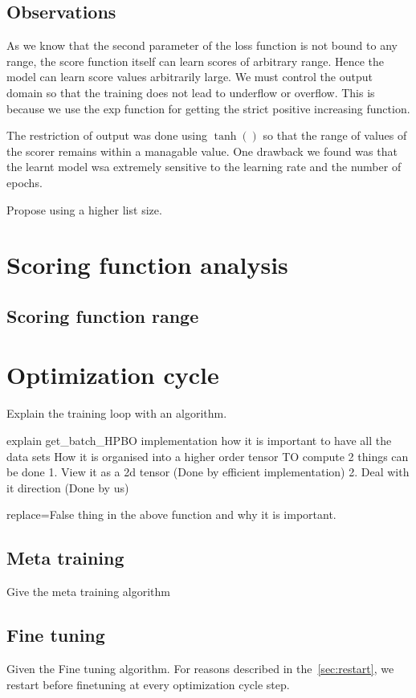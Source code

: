 \documentclass[11pt]{report}
\begin{document}
\subsection{Observations}
As we know that the second parameter of the loss function is not bound to any range, 
the score function itself can learn scores of arbitrary range.
Hence the model can learn score values arbitrarily large.
We must control the output domain so that the training does not lead to underflow or overflow.
This is because we use the exp function for getting the strict positive increasing function.

The restriction of output was done using $\tanh()$ so that the range of values of the scorer remains within a managable value.
One drawback we found was that the learnt model wsa extremely sensitive to the learning rate and the number of epochs.

  
Propose using a higher list size.

\section{Scoring function analysis}

\subsection{Scoring function range}

\section{Optimization cycle}
Explain the training loop with an algorithm.

explain get\_batch\_HPBO implementation how it is important to have all the data sets
How it is organised into a higher order tensor
TO compute 2 things can be done
  1. View it as a 2d tensor (Done by efficient implementation)
     2. Deal with it direction (Done by us)

replace=False thing in the above function and why it is important.

\subsection{Meta training}
Give the meta training algorithm

\subsection{Fine tuning}\label{sec:rlfinetune}
Given the Fine tuning algorithm.
For reasons described in the~\ref{sec:restart},  we restart before finetuning at every optimization cycle step.
\end{document}
